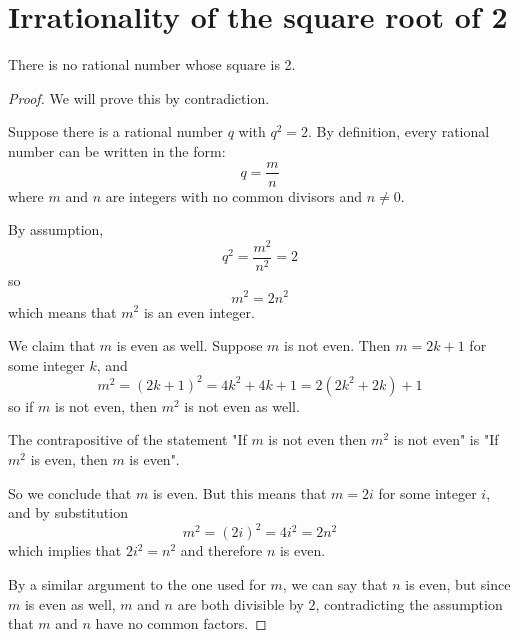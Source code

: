 \section{Irrationality of the square root of 2}
\begin{theorem}
There is no rational number whose square is 2.
\end{theorem}

\begin{proof} 
We will prove this by contradiction.  
\par\vspace{0.3 cm}
Suppose there is a rational number $q$ with $q^2=2$.  By definition, every rational number can be written in the form:
\[
q = \frac{m}{n} 
\]
where $m$ and $n$ are integers with no common divisors and $n\neq0$.
\par\vspace{0.3 cm}
By assumption,
\[
q^2 = \frac{m^2}{n^2} = 2
\]
so
\[
m^2 = 2n^2
\]
which means that $m^2$ is an even integer.  
\par\vspace{0.3 cm}
We claim that $m$ is even as well.  Suppose $m$ is not even.  Then $m=2k+1$ for some integer $k$, and 
\[
m^2 = (2k+1)^2 = 4k^2+4k+1 = 2(2k^2+2k)+1
\]
so if $m$ is not even, then $m^2$ is not even as well.  
\par\vspace{0.3 cm}
The contrapositive of the statement "If $m$ is not even then $m^2$ is not even" is "If $m^2$ is even, then $m$ is even".
\par\vspace{0.3 cm}
So we conclude that $m$ is even.  But this means that $m = 2i$ for some integer $i$, and by substitution
\[
m^2 = (2i)^2 = 4i^2 =2n^2
\]
which implies that $2i^2 = n^2$ and therefore $n$ is even.  
\par\vspace{0.3 cm}
By a similar argument to the one used for $m$, we can say that $n$ is even, but since $m$ is even as well, $m$ and $n$ are both divisible by $2$, contradicting the assumption that $m$ and $n$ have no common factors.
\end{proof}

